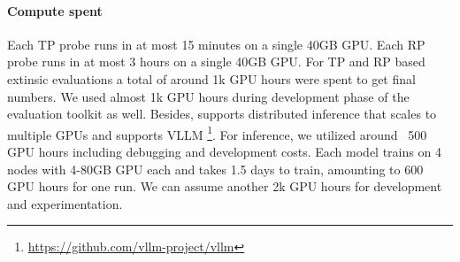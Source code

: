 \paragraph{Compute spent}
Each TP probe runs in at most 15 minutes on a single 40GB GPU.
Each RP probe runs in at most 3 hours on a single 40GB GPU.
For TP and RP based extinsic evaluations a total of around 1k GPU hours were spent to get final numbers.
We used almost 1k GPU hours during development phase of the evaluation toolkit as well.
Besides, \bench supports distributed inference that scales to multiple GPUs and supports VLLM \footnote{\url{https://github.com/vllm-project/vllm}}.
For inference, we utilized around ~500 GPU hours including debugging and development costs.
Each \powsmctc model trains on 4 nodes with 4-80GB GPU each and takes 1.5 days to train, amounting to 600 GPU hours for one run.
We can assume another 2k GPU hours for development and experimentation.


